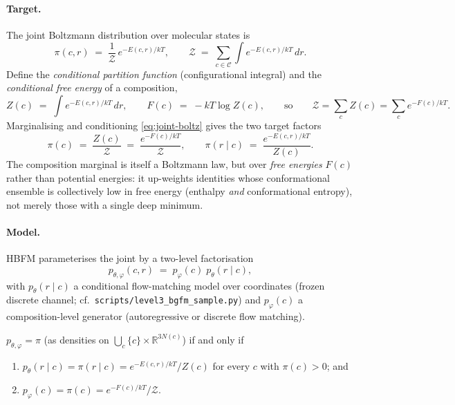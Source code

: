 \paragraph{Target.}
The joint Boltzmann distribution over molecular states is
\begin{equation}
\pi(c, r) \;=\; \frac{1}{\mathcal{Z}}\, e^{-E(c,r)/kT},
\qquad
\mathcal{Z} \;=\; \sum_{c \in \mathcal{C}} \int e^{-E(c,r)/kT}\, dr .
\label{eq:joint-boltz}
\end{equation}
Define the \emph{conditional partition function} (configurational integral) and the
\emph{conditional free energy} of a composition,
\begin{equation}
Z(c) \;=\; \int e^{-E(c,r)/kT}\, dr,
\qquad
F(c) \;=\; -kT \log Z(c),
\qquad\text{so}\qquad
\mathcal{Z} = \sum_{c} Z(c) = \sum_{c} e^{-F(c)/kT}.
\label{eq:Zc}
\end{equation}
Marginalising and conditioning \eqref{eq:joint-boltz} gives the two target factors
\begin{equation}
\pi(c) \;=\; \frac{Z(c)}{\mathcal{Z}} \;=\; \frac{e^{-F(c)/kT}}{\mathcal{Z}},
\qquad
\pi(r \mid c) \;=\; \frac{e^{-E(c,r)/kT}}{Z(c)} .
\label{eq:target-factors}
\end{equation}
The composition marginal is itself a Boltzmann law, but over \emph{free energies}
$F(c)$ rather than potential energies: it up-weights identities whose conformational
ensemble is collectively low in free energy (enthalpy \emph{and} conformational
entropy), not merely those with a single deep minimum.

\paragraph{Model.}
HBFM parameterises the joint by a two-level factorisation
\begin{equation}
p_{\theta,\varphi}(c, r) \;=\; p_{\varphi}(c)\; p_{\theta}(r \mid c),
\end{equation}
with $p_\theta(r\mid c)$ a conditional flow-matching model over coordinates (frozen
discrete channel; cf.\ \texttt{scripts/level3\_bgfm\_sample.py}) and $p_\varphi(c)$ a
composition-level generator (autoregressive or discrete flow matching).

\begin{theorem}
\label{thm:hbc}
$p_{\theta,\varphi} = \pi$ (as densities on $\bigcup_c \{c\}\times\mathbb{R}^{3N(c)}$)
if and only if
\begin{enumerate}
  \item[(i)] $p_\theta(r\mid c) = \pi(r\mid c) = e^{-E(c,r)/kT}/Z(c)$ for every $c$ with $\pi(c)>0$; and
  \item[(ii)] $p_\varphi(c) = \pi(c) = e^{-F(c)/kT}/\mathcal{Z}$.
\end{enumerate}
\end{theorem}

